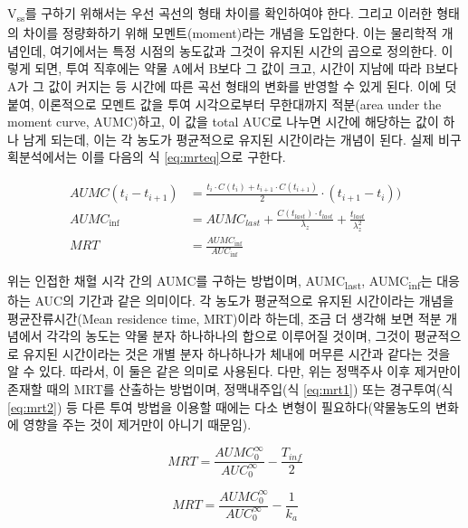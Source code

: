 \documentclass[
  11pt,
  krantz2, a4paper, twoside]{krantz}
\theoremstyle{definition}
\theoremstyle{definition}
\theoremstyle{definition}
\theoremstyle{definition}
\theoremstyle{remark}
\begin{document}

V\textsubscript{ss}를 구하기 위해서는 우선 곡선의 형태 차이를 확인하여야 한다.
그리고 이러한 형태의 차이를 정량화하기 위해 모멘트(moment)라는 개념을 도입한다.
이는 물리학적 개념인데, 여기에서는 특정 시점의 농도값과 그것이 유지된 시간의 곱으로 정의한다.
이렇게 되면, 투여 직후에는 약물 A에서 B보다 그 값이 크고, 시간이 지남에 따라 B보다 A가 그 값이 커지는 등 시간에 따른 곡선 형태의 변화를 반영할 수 있게 된다.
이에 덧붙여, 이론적으로 모멘트 값을 투여 시각으로부터 무한대까지 적분(area under the moment curve, AUMC)하고, 이 값을 total AUC로 나누면 시간에 해당하는 값이 하나 남게 되는데, 이는 각 농도가 평균적으로 유지된 시간이라는 개념이 된다.
실제 비구획분석에서는 이를 다음의 식 \eqref{eq:mrteq}으로 구한다.

\begin{equation}
\begin{split}
  AUMC(t_i-t_{i+1}) &= \frac{t_i \cdot C(t_i) + t_{i+1} \cdot C(t_{i+1})}{2} \cdot (t_{i+1}-t_i)) \\
  AUMC_{\inf} &= AUMC_{last} + \frac{C(t_{last}) \cdot t_{last}}{\lambda_z} + \frac{t_{last}}{\lambda_z^2} \\
  MRT &= \frac{AUMC_{\inf}}{AUC_{\inf}}
\end{split}
\label{eq:mrteq}
\end{equation}

위는 인접한 채혈 시각 간의 AUMC를 구하는 방법이며, AUMC\textsubscript{last}, AUMC\textsubscript{inf}는 대응하는 AUC의 기간과 같은 의미이다.
각 농도가 평균적으로 유지된 시간이라는 개념을 평균잔류시간(Mean residence time, MRT)이라 하는데, 조금 더 생각해 보면 적분 개념에서 각각의 농도는 약물 분자 하나하나의 합으로 이루어질 것이며, 그것이 평균적으로 유지된 시간이라는 것은 개별 분자 하나하나가 체내에 머무른 시간과 같다는 것을 알 수 있다.
따라서, 이 둘은 같은 의미로 사용된다.
다만, 위는 정맥주사 이후 제거만이 존재할 때의 MRT를 산출하는 방법이며, 정맥내주입(식 \eqref{eq:mrt1}) 또는 경구투여(식 \eqref{eq:mrt2}) 등 다른 투여 방법을 이용할 때에는 다소 변형이 필요하다(약물농도의 변화에 영향을 주는 것이 제거만이 아니기 때문임).

\begin{equation}
MRT = \frac{AUMC_{0}^{\infty}}{AUC_{0}^{\infty}} - \frac{T_{inf}}{2}
\label{eq:mrt1}
\end{equation}

\begin{equation}
MRT = \frac{AUMC_{0}^{\infty}}{AUC_{0}^{\infty}} - \frac{1}{k_a}
\label{eq:mrt2}
\end{equation}
\end{document}
